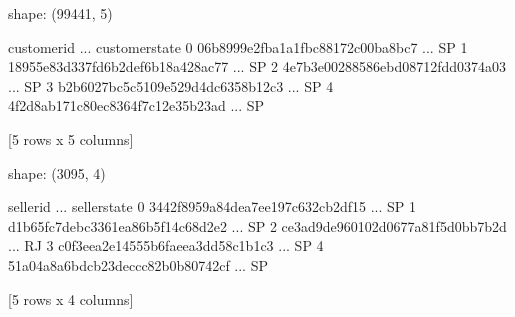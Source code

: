 \documentclass[letterpaper,10pt,english]{jupyterBook}
\begin{document}
\begin{sphinxVerbatim}[commandchars=\\\{\}]
shape: (99441, 5)
\end{sphinxVerbatim}

\begin{sphinxVerbatim}[commandchars=\\\{\}]
                        customer\PYGZus{}id  ... customer\PYGZus{}state
0  06b8999e2fba1a1fbc88172c00ba8bc7  ...             SP
1  18955e83d337fd6b2def6b18a428ac77  ...             SP
2  4e7b3e00288586ebd08712fdd0374a03  ...             SP
3  b2b6027bc5c5109e529d4dc6358b12c3  ...             SP
4  4f2d8ab171c80ec8364f7c12e35b23ad  ...             SP

[5 rows x 5 columns]
\end{sphinxVerbatim}

\begin{sphinxVerbatim}[commandchars=\\\{\}]
  
  
\end{sphinxVerbatim}

\begin{sphinxVerbatim}[commandchars=\\\{\}]
shape: (3095, 4)
\end{sphinxVerbatim}

\begin{sphinxVerbatim}[commandchars=\\\{\}]
                          seller\PYGZus{}id  ...  seller\PYGZus{}state
0  3442f8959a84dea7ee197c632cb2df15  ...            SP
1  d1b65fc7debc3361ea86b5f14c68d2e2  ...            SP
2  ce3ad9de960102d0677a81f5d0bb7b2d  ...            RJ
3  c0f3eea2e14555b6faeea3dd58c1b1c3  ...            SP
4  51a04a8a6bdcb23deccc82b0b80742cf  ...            SP

[5 rows x 4 columns]
\end{sphinxVerbatim}

\begin{sphinxVerbatim}[commandchars=\\\{\}]
  
  
\end{sphinxVerbatim}
\end{document}
